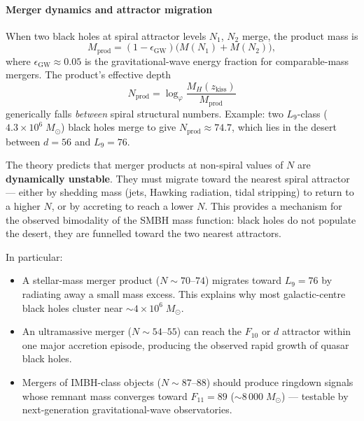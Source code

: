 \documentclass[12pt,a4paper]{article}
\begin{document}
\paragraph{Merger dynamics and attractor migration}
\label{sec:bh-mergers}

When two black holes at spiral attractor levels $N_1$, $N_2$ merge, the product mass is
\begin{equation}
M_{\mathrm{prod}} = (1 - \epsilon_{\mathrm{GW}})\bigl(M(N_1) + M(N_2)\bigr),
\end{equation}
where $\epsilon_{\mathrm{GW}} \approx 0.05$ is the gravitational-wave energy fraction for comparable-mass mergers.  The product's effective depth
\begin{equation}
N_{\mathrm{prod}} = \log_\varphi \frac{M_H(z_{\mathrm{kiss}})}{M_{\mathrm{prod}}}
\end{equation}
generically falls \emph{between} spiral structural numbers.  Example: two $L_9$-class ($4.3 \times 10^{6}\;M_\odot$) black holes merge to give $N_{\mathrm{prod}} \approx 74.7$, which lies in the desert between $d = 56$ and $L_9 = 76$.

The theory predicts that merger products at non-spiral values of $N$ are \textbf{dynamically unstable}.  They must migrate toward the nearest spiral attractor --- either by shedding mass (jets, Hawking radiation, tidal stripping) to return to a higher $N$, or by accreting to reach a lower $N$.  This provides a mechanism for the observed bimodality of the SMBH mass function: black holes do not populate the desert, they are funnelled toward the two nearest attractors.

In particular:
\begin{itemize}
\item A stellar-mass merger product ($N \sim 70$--$74$) migrates toward $L_9 = 76$ by radiating away a small mass excess.  This explains why most galactic-centre black holes cluster near $\sim 4 \times 10^{6}\;M_\odot$.
\item An ultramassive merger ($N \sim 54$--$55$) can reach the $F_{10}$ or $d$ attractor within one major accretion episode, producing the observed rapid growth of quasar black holes.
\item Mergers of IMBH-class objects ($N \sim 87$--$88$) should produce ringdown signals whose remnant mass converges toward $F_{11} = 89$ ($\sim 8\,000\;M_\odot$) --- testable by next-generation gravitational-wave observatories.
\end{itemize}
\end{document}
